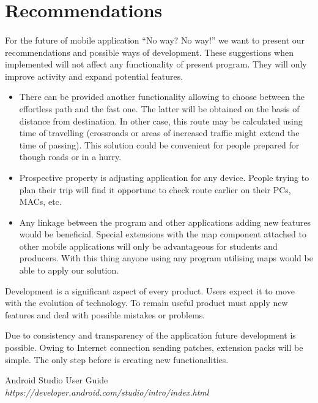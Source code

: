 \documentclass[12pt]{article}
\begin{document}
\section{Recommendations}
\paragraph{}
 For the future of mobile application ``No way? No way!'' we want to present our recommendations and possible ways of development.
These suggestions when implemented will not affect any functionality of present program.
They will only improve activity and expand potential features.

\begin{itemize}
	\item There can be provided another functionality allowing to choose between the effortless path and the fast one.
	The latter will be obtained on the basis of distance from destination.
	In other case, this route may be calculated using time of travelling (crossroads or areas of increased traffic might extend the time of passing).
	This solution could be convenient for people prepared for though roads or in a hurry.
	
	\item Prospective property is adjusting application for any device.
	People trying to plan their trip will find it opportune to check route earlier on their PCs, MACs, etc.
	
	\item Any linkage between the program and other applications adding new features would be beneficial.
	Special extensions with the map component attached to other mobile applications will only be advantageous for students and producers.
	With this thing anyone using any program utilising maps would be able to apply our solution.
\end{itemize}

Development is a significant aspect of every product.
Users expect it to move with the evolution of technology.
To remain useful product must apply new features and deal with possible mistakes or problems.

Due to consistency and transparency of the application future development is possible.
Owing to Internet connection sending patches, extension packs will be simple.
The only step before is creating new functionalities.

\newpage
\listoffigures

\newpage
\begin{thebibliography}{9}
Android Studio User Guide
\textit {https://developer.android.com/studio/intro/index.html}

\end{thebibliography}
\end{document}
